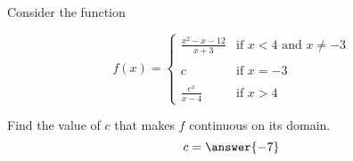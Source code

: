 \documentclass{ximera}
\author{Nela Lakos \and Kyle Parsons \and Bobby Ramsey}
\begin{document}
\begin{exercise}

Consider the function

\[
	f(x) = 
	\begin{cases}
		\frac{x^2-x-12}{x+3} & \text{if }x<4\text{ and }x\neq-3\\ \\
		c & \text{if }x=-3\\ \\
		\frac{e^x}{x-4} & \text{if }x>4
	\end{cases}
\]

Find the value of $c$ that makes $f$ continuous on its domain.
\[c=\answer{-7}\]

\end{exercise}
\end{document}
